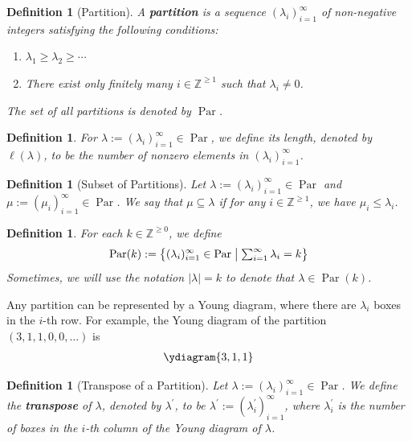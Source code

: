 \documentclass[12pt,reqno,a4paper]{amsart}
\newcommand{\bb}[1]{\mathbb{#1}}
\numberwithin{equation}{section}
\newtheorem{dfn}[thm]{Definition}
\theoremstyle{definition}
\begin{document}
\begin{dfn}[Partition]
A \textbf{partition} is a sequence $(\lambda_i)_{i = 1}^{\infty}$ of non-negative integers satisfying the following conditions:
\begin{enumerate}[(1)]
\item $\lambda_1 \geq \lambda_2 \geq \cdots$
\item There exist only finitely many $i \in \bb{Z}^{\geq 1}$ such that $\lambda_i \neq 0$. 
\end{enumerate}
The set of all partitions is denoted by $\operatorname{Par}$. 
\end{dfn}

\begin{dfn}
For $\lambda := (\lambda_i)_{i = 1}^{\infty} \in \operatorname{Par}$, we define its length, denoted by $\ell(\lambda)$, to be the number of nonzero elements in $(\lambda_i)_{i = 1}^{\infty}$.  
\end{dfn}

\begin{dfn}[Subset of Partitions]
Let $\lambda := (\lambda_i)_{i = 1}^{\infty} \in \operatorname{Par}$ and $\mu := (\mu_i)_{i = 1}^{\infty} \in \operatorname{Par}$. We say that $\mu \subseteq \lambda$ if for any $i \in \bb{Z}^{\geq 1}$, we have $\mu_i \leq \lambda_i$. 
\end{dfn}

\begin{dfn}
For each $k \in \bb{Z}^{\geq 0}$, we define 
\begin{align}
\operatorname{Par}(k) := 
\left\{
(\lambda_i)_{i = 1}^{\infty} \in \operatorname{Par}
\;\middle\vert\;
\begin{array}{@{}l@{}}
\sum_{i = 1}^{\infty}\lambda_i = k
\end{array}
\right\}
\end{align}
Sometimes, we will use the notation $|\lambda| = k$ to denote that $\lambda \in \operatorname{Par}(k)$. 
\end{dfn}



Any partition can be represented by a Young diagram, where there are $\lambda_i$ boxes in the $i$-th row. For example, the Young diagram of the partition $(3,1,1,0,0,\dots)$ is 
\begin{align}
\ydiagram{3,1,1}
\end{align}

\begin{dfn}[Transpose of a Partition]
Let $\lambda := (\lambda_i)_{i = 1}^{\infty} \in \operatorname{Par}$. We define the \textbf{transpose} of $\lambda$, denoted by $\lambda^\prime$, to be $\lambda^\prime := (\lambda^\prime_i)_{i = 1}^{\infty}$, where $\lambda^\prime_i$ is the number of boxes in the $i$-th column of the Young diagram of $\lambda$. 
\end{dfn}
\end{document}
